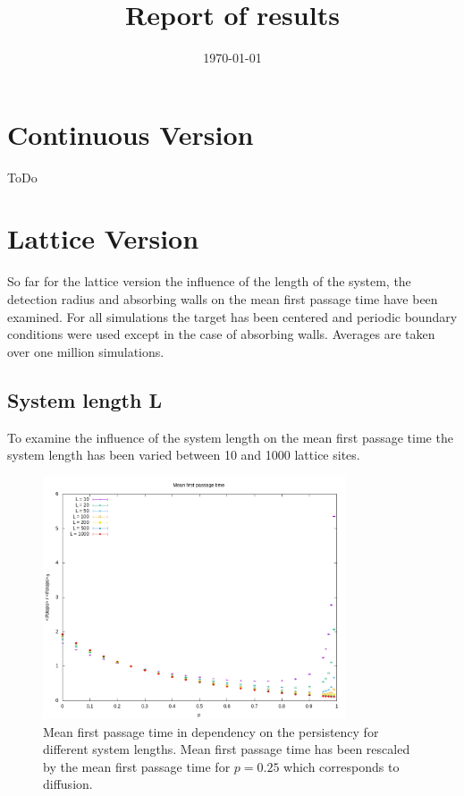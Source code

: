 \documentclass[]{scrartcl}
\title{Report of results}
\date{\today}
\begin{document}
\maketitle

\section{Continuous Version}
\label{sec:cv}

ToDo



\section{Lattice Version}
\label{sec:lv}

So far for the lattice version the influence of the length of the system, the detection radius and absorbing walls on the mean first passage time have been examined. For all simulations the target has been centered and periodic boundary conditions were used except in the case of absorbing walls. Averages are taken over one million simulations.


\subsection{System length L}
\label{ssec:sysL}

To examine the influence of the system length on the mean first passage time the system length has been varied between 10 and 1000 lattice sites.

\begin{figure}[!hbt]
 \centering
 \includegraphics[width=0.8\textwidth]{./fig/sysL/fpt.png}
 \caption{Mean first passage time in dependency on the persistency for different system lengths. Mean first passage time has been rescaled by the mean first passage time for $p = 0.25$ which corresponds to diffusion.}\label{fig:sysL-fpt}
\end{figure}
\end{document}
